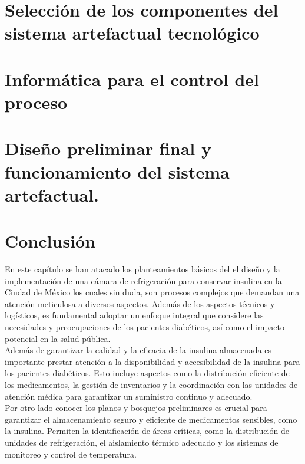 \newpage
\section{Selección de los componentes del sistema artefactual tecnológico}

\newpage
\section{Informática para el control del proceso}

\newpage
\section{Diseño preliminar final y funcionamiento del sistema artefactual.}



\newpage
\section{Conclusión}
En este capítulo se han atacado los planteamientos básicos del el diseño y la implementación de una cámara de refrigeración para conservar insulina en la Ciudad de México los cuales sin duda, son procesos complejos que demandan una atención meticulosa a diversos aspectos. Además de los aspectos técnicos y logísticos, es fundamental adoptar un enfoque integral que considere las necesidades y preocupaciones de los pacientes diabéticos, así como el impacto potencial en la salud pública.\\ 
Además de garantizar la calidad y la eficacia de la insulina almacenada es importante prestar atención a la disponibilidad y accesibilidad de la insulina para los pacientes diabéticos. Esto incluye aspectos como la distribución eficiente de los medicamentos, la gestión de inventarios y la coordinación con las unidades de atención médica para garantizar un suministro continuo y adecuado. \\
Por otro lado conocer los planos y bosquejos preliminares es crucial para garantizar el almacenamiento seguro y eficiente de medicamentos sensibles, como la insulina. Permiten la identificación de áreas críticas, como la distribución de unidades de refrigeración, el aislamiento térmico adecuado y los sistemas de monitoreo y control de temperatura.

